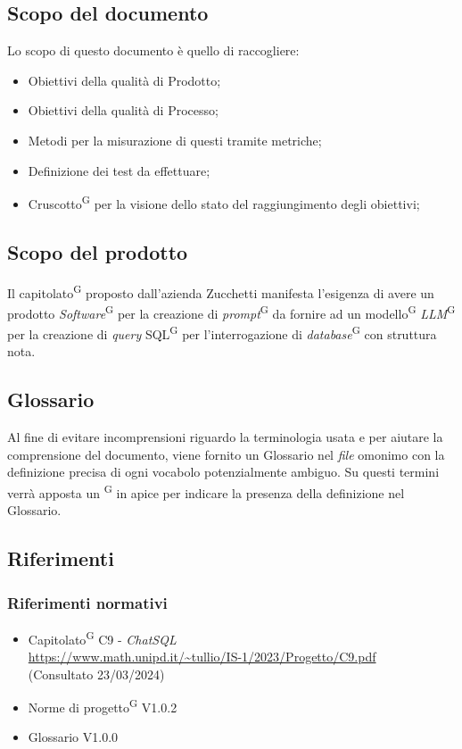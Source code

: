 \documentclass[5pt]{article}
\begin{document}
	\subsection{Scopo del documento}
	Lo scopo di questo documento è quello di raccogliere:
	\begin{itemize}
		\item Obiettivi della qualità di Prodotto;
		\item Obiettivi della qualità di Processo;
		\item Metodi per la misurazione di questi tramite metriche;
		\item Definizione dei test da effettuare;
		\item Cruscotto\textsuperscript{G} per la visione dello stato del raggiungimento degli obiettivi;
	\end{itemize}
	
	\subsection{Scopo del prodotto}
	Il capitolato\textsuperscript{G} proposto dall'azienda Zucchetti manifesta l'esigenza di avere un prodotto \textit{Software}\textsuperscript{G} per la creazione di \textit{prompt}\textsuperscript{G} da fornire ad un modello\textsuperscript{G} \textit{LLM}\textsuperscript{G} per la creazione di \textit{query} SQL\textsuperscript{G} per l'interrogazione di \textit{database}\textsuperscript{G} con struttura nota.
	
	\subsection{Glossario}
	Al fine di evitare incomprensioni riguardo la terminologia usata e per aiutare la comprensione del documento,
	viene fornito un Glossario nel \textit{file} omonimo con la definizione precisa di ogni vocabolo potenzialmente ambiguo. Su questi termini verrà apposta un \textsuperscript{G} in apice per indicare la presenza della definizione nel Glossario.
	
	\subsection{Riferimenti}
	\subsubsection{Riferimenti normativi}
	\begin{itemize}
		\item Capitolato\textsuperscript{G} C9 - \textit{ChatSQL} \\ \url{https://www.math.unipd.it/~tullio/IS-1/2023/Progetto/C9.pdf} \\ (Consultato 23/03/2024)
		\item Norme di progetto\textsuperscript{G} V1.0.2
		\item Glossario V1.0.0
	\end{itemize}
\end{document}
